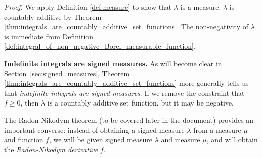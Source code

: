 \documentclass{article} %
\begin{document}
\begin{proof}
We apply Definition \ref{def:measure} to show that $\lambda$ is a measure.   $\lambda$ is countably additive by Theorem \ref{thm:integrals_are_countably_additive_set_functions}.  
The non-negativity of $\lambda$ is immediate from Definition \ref{def:integral_of_non_negative_Borel_measurable_function}. 
\end{proof}



\begin{remark}{\textbf{Indefinite integrals are signed measures.}}
As will become clear in Section~\ref{sec:signed_measures}, Theorem \ref{thm:integrals_are_countably_additive_set_functions} more generally tells us that \textit{indefinite integrals are signed measures}.	 If we remove the constraint that $f \geq 0$, then $\lambda$ is a countably additive set function, but it may be negative. 

The Radon-Nikodym theorem (to be covered later in the document) provides an important converse:  instead of obtaining a signed measure $\lambda$ from a measure $\mu$ and function $f$, we will be given signed measure $\lambda$ and measure $\mu$, and will obtain the \textit{Radon-Nikodym derivative} $f$.
\end{remark}
\end{document}
